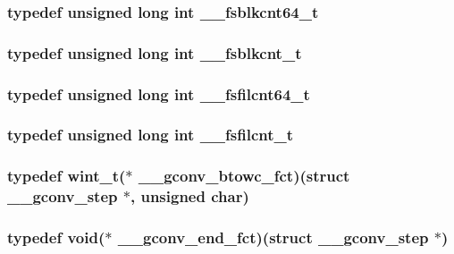 \subsubsection[{\_\-\_\-fsblkcnt64\_\-t}]{\setlength{\rightskip}{0pt plus 5cm}typedef unsigned long int {\bf \_\-\_\-fsblkcnt64\_\-t}}\label{tp_8c_aaa22e7ab83155a700a5f5b4272597d59}
\subsubsection[{\_\-\_\-fsblkcnt\_\-t}]{\setlength{\rightskip}{0pt plus 5cm}typedef unsigned long int {\bf \_\-\_\-fsblkcnt\_\-t}}\label{tp_8c_af120b3f0280c7a3c342fc214375d1673}
\subsubsection[{\_\-\_\-fsfilcnt64\_\-t}]{\setlength{\rightskip}{0pt plus 5cm}typedef unsigned long int {\bf \_\-\_\-fsfilcnt64\_\-t}}\label{tp_8c_aedfc0309f72fd03c3f5a5e11681cb12a}
\subsubsection[{\_\-\_\-fsfilcnt\_\-t}]{\setlength{\rightskip}{0pt plus 5cm}typedef unsigned long int {\bf \_\-\_\-fsfilcnt\_\-t}}\label{tp_8c_ae242a1310dcddb7970238a341b07c4d0}
\subsubsection[{\_\-\_\-gconv\_\-btowc\_\-fct}]{\setlength{\rightskip}{0pt plus 5cm}typedef {\bf wint\_\-t}($\ast$ {\bf \_\-\_\-gconv\_\-btowc\_\-fct})(struct {\bf \_\-\_\-gconv\_\-step} $\ast$, unsigned char)}\label{tp_8c_a20927d02f3400da97f16f1a104d7dc30}
\subsubsection[{\_\-\_\-gconv\_\-end\_\-fct}]{\setlength{\rightskip}{0pt plus 5cm}typedef void($\ast$ {\bf \_\-\_\-gconv\_\-end\_\-fct})(struct {\bf \_\-\_\-gconv\_\-step} $\ast$)}\label{tp_8c_a8801ba2fa3c4883c203a4ce00d6b107c}
